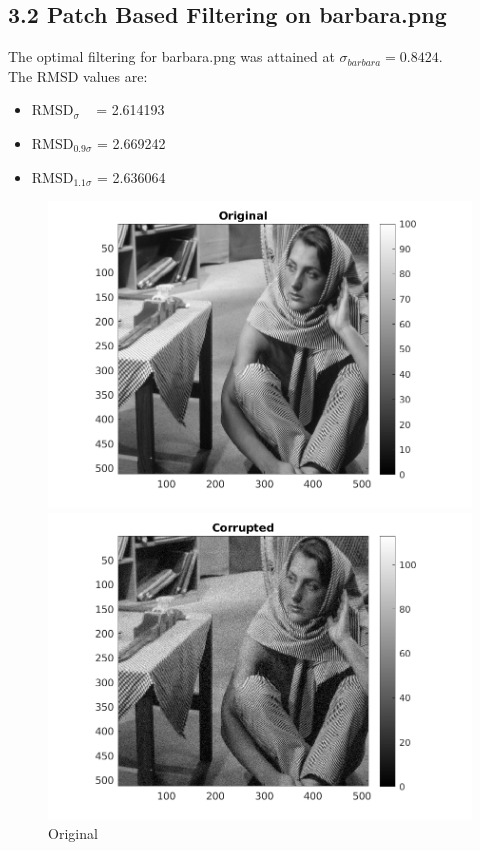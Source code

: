 \documentclass[12pt, a4paper]{article}
\begin{document}
\subsection*{3.2 Patch Based Filtering on barbara.png}
\noindent The optimal filtering for barbara.png was attained at $\sigma_{barbara} = 0.8424$. \\
The RMSD values are:
\begin{itemize}
	\item RMSD$_{\sigma}\;\;\;$  = 2.614193
	\item RMSD$_{0.9\sigma}$ = 2.669242
	\item RMSD$_{1.1\sigma}$ = 2.636064
\end{itemize}
\begin{figure}[h]
    \centering
    \renewcommand{\thefigure}{3.2(a)}
    \begin{minipage}[c][1\width]{0.3\textwidth}
    	\hspace*{-1in}
    	\includegraphics[width=1.5\textwidth]{barbara_original.png}
    	\caption{Original}
	    \label{fig:3.2(a)}
    \end{minipage}
    \renewcommand{\thefigure}{3.2(b)}
    \begin{minipage}[c][1\width]{0.3\textwidth}
    	\hspace*{-0.5in}
    	\includegraphics[width=1.5\textwidth]{barbara_corrupted.png}

\end{minipage}
\end{figure}
\end{document}
